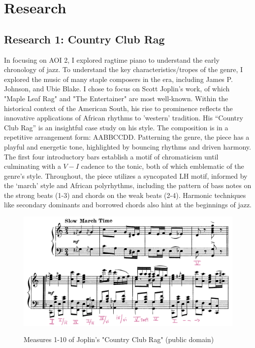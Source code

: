 \documentclass[11pt,a4paper]{article}
\begin{document}
\section{Research}

\subsection{Research 1: Country Club Rag}

In focusing on AOI 2, I explored ragtime piano to understand the early chronology of jazz. To understand the key characteristics/tropes of the genre, I explored the music of many staple composers in the era, including James P. Johnson, and Ubie Blake. I chose to focus on Scott Joplin’s work, of which "Maple Leaf Rag" and "The Entertainer" are most well-known. Within the historical context of the American South, his rise to prominence reflects the innovative applications of African rhythms to 'western' tradition.\autocite[45]{joplinArticle}
His “Country Club Rag” is an insightful case study on his style. The composition is in a repetitive arrangement form: AABBCCDD. Patterning the genre, the piece has a playful and energetic tone, highlighted by bouncing rhythms and driven harmony. The first four introductory bars establish a motif of chromaticism until culminating with a $V-I$ cadence to the tonic, both of which emblematic of the genre's style. Throughout, the piece utilizes a syncopated LH motif, informed by the ‘march’ style and African polyrhythms, including the pattern of bass notes on the strong beats (1-3) and chords on the weak beats (2-4). Harmonic techniques like secondary dominants and borrowed chords also hint at the beginnings of jazz. 
\begin{figure}[ht]
\begin{center}
\includegraphics[width=\linewidth]{country} \\
\caption{Measures 1-10 of Joplin's "Country Club Rag" (public domain)\autocite{joplin}}
\label{fig:joplin}
\end{center}
\end{figure}
\end{document}
